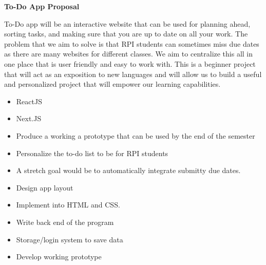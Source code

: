\documentclass[12pt]{article}
\begin{document}
\begin{center}
{\huge \bf To-Do App Proposal}
\end{center}
\bigskip


\bigskip

\noindent To-Do app will be an interactive website that can be used for planning ahead, sorting tasks, 
and making sure that you are up to date on all your work. The problem that we aim to solve is that RPI 
students can sometimes miss due dates as there are many websites for different classes.
We aim to centralize this all in one place that is user friendly and easy to work with.
This is a beginner project that will act as an exposition to new languages and will allow us to
build a useful and personalized project that will empower our learning capabilities.

\bigskip

\begin{itemize}{}
  \item ReactJS
  \item Next.JS
\end{itemize}

\bigskip

\begin{itemize}
  \item Produce a working a prototype that can be used by the end of the semester
  \item Personalize the to-do list to be for RPI students
  \item A stretch goal would be to automatically integrate submitty due dates.
\end{itemize}
\bigskip


\medskip

\begin{itemize}
  \item Design app layout
  \item Implement into HTML and CSS.
\end{itemize}

\begin{itemize}
  \item Write back end of the program
  \item Storage/login system to save data
  \item Develop working prototype
\end{itemize}
\end{document}

